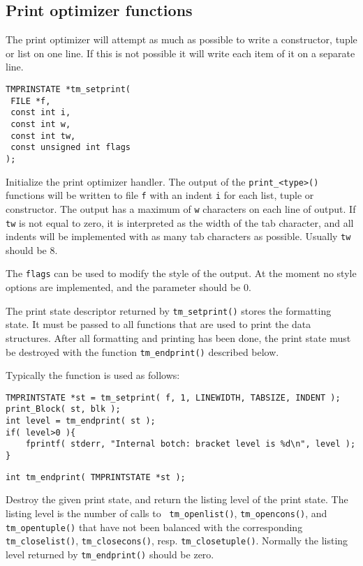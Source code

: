 \subsection{Print optimizer functions}
The print optimizer will attempt as much as possible to write a constructor,
tuple or list on one line.
If this is not possible it will write each item of it on a separate line.
\par
\begin{verbatim}
TMPRINSTATE *tm_setprint(
 FILE *f,
 const int i,
 const int w,
 const int tw,
 const unsigned int flags
);
\end{verbatim}
\begin{desc}
Initialize the print optimizer handler.
The output of the {\tt print\_<type>()} functions will be written to
file {\tt f} with an indent {\tt i} for each list, tuple or constructor.
The output has a maximum of {\tt w} characters on each line of output.
If {\tt tw} is not equal to zero, it is interpreted as the width of the
tab character, and all indents will be implemented with as many tab
characters as possible.
Usually \verb'tw' should be 8.
\par
The {\tt flags} can be used to modify the style of the output. At the
moment no style options are implemented, and the parameter should be 0.
\par
The print state descriptor returned by {\tt tm\_setprint()} stores the
formatting state. It must be passed to all functions that are used to
print the data structures. After all formatting and printing has been
done, the print state must be destroyed with the function {\tt tm\_endprint()}
described below.
\par
Typically the function is used as follows:
\begin{verbatim}
TMPRINTSTATE *st = tm_setprint( f, 1, LINEWIDTH, TABSIZE, INDENT );
print_Block( st, blk );
int level = tm_endprint( st );
if( level>0 ){
    fprintf( stderr, "Internal botch: bracket level is %d\n", level );
}
\end{verbatim}
\end{desc}
\begin{verbatim}
int tm_endprint( TMPRINTSTATE *st );
\end{verbatim}
\begin{desc}
Destroy the given print state, and return the listing level of
the print state. The listing level is the number of calls to {\tt
tm\_openlist()}, {\tt tm\_opencons()}, and {\tt tm\_opentuple()} that
have not been balanced with the corresponding {\tt tm\_closelist()},
{\tt tm\_closecons()}, resp.  {\tt tm\_closetuple()}. Normally the
listing level returned by {\tt tm\_endprint()} should be zero.
\end{desc}
